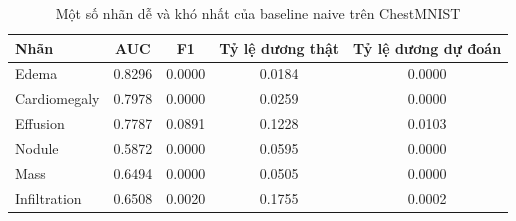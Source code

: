 \begin{table}[H]
\centering
\caption{Một số nhãn dễ và khó nhất của baseline naive trên ChestMNIST}
\label{tab:chestmnist-per-class-auc}
\begin{tabular}{l c c c c}
\toprule
Nhãn & AUC & F1 & Tỷ lệ dương thật & Tỷ lệ dương dự đoán \\
\midrule
Edema & 0.8296 & 0.0000 & 0.0184 & 0.0000 \\
Cardiomegaly & 0.7978 & 0.0000 & 0.0259 & 0.0000 \\
Effusion & 0.7787 & 0.0891 & 0.1228 & 0.0103 \\
Nodule & 0.5872 & 0.0000 & 0.0595 & 0.0000 \\
Mass & 0.6494 & 0.0000 & 0.0505 & 0.0000 \\
Infiltration & 0.6508 & 0.0020 & 0.1755 & 0.0002 \\
\bottomrule
\end{tabular}
\end{table}
